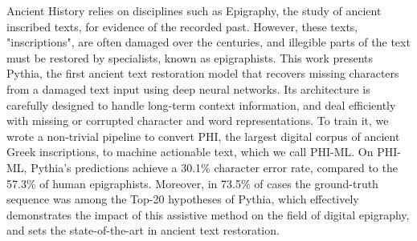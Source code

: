 Ancient History relies on disciplines such as Epigraphy, the study of ancient inscribed texts, for evidence of the recorded past. However, these texts, "inscriptions", are often damaged over the centuries, and illegible parts of the text must be restored by specialists, known as epigraphists. This work presents Pythia, the first ancient text restoration model that recovers missing characters from a damaged text input using deep neural networks. Its architecture is carefully designed to handle long-term context information, and deal efficiently with missing or corrupted character and word representations. To train it, we wrote a non-trivial pipeline to convert PHI, the largest digital corpus of ancient Greek inscriptions, to machine actionable text, which we call PHI-ML. On PHI-ML, Pythia's predictions achieve a 30.1\% character error rate, compared to the 57.3\% of human epigraphists. Moreover, in 73.5\% of cases the ground-truth sequence was among the Top-20 hypotheses of Pythia, which effectively demonstrates the impact of this assistive method on the field of digital epigraphy, and sets the state-of-the-art in ancient text restoration.